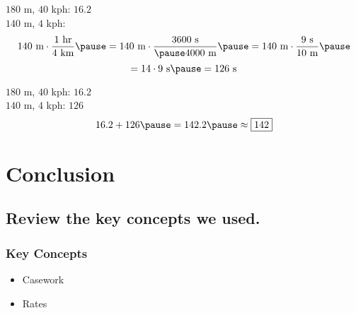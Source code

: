 \documentclass{beamer} %
\begin{document}
\begin{frame}
$180$ m, $40$ kph: $16.2$ \pause
\[
\]
$140$ m, $4$ kph: \pause
\[
140 \text{ m} \cdot \frac{1 \text{ hr}}{4 \text{ km}} \pause = 140 \text{ m} \cdot \frac{3600 \text{ s}}{\pause 4000 \text{ m}} \pause = 140 \text{ m} \cdot \frac{9 \text{ s}}{10 \text{ m}} \pause
\]
\[
= 14 \cdot 9 \text{ s} \pause = 126 \text{ s}
\]
\end{frame}

\begin{frame}
$180$ m, $40$ kph: $16.2$
\[
\]
$140$ m, $4$ kph: $126$ \pause
\[
16.2 + 126 \pause = 142.2 \pause \approx \boxed{142}
\]
\end{frame}

\setcounter{equation}{0}

\section{Conclusion}

\subsection*{Review the key concepts we used.}

\begin{frame}
  \frametitle{Key Concepts}
  \pause
  \begin{itemize}
  \item Casework \pause
  \item Rates
  \end{itemize}
\end{frame}

\begin{comment}

\subsection*{This is Tim.}

\tcbset{colframe=ml3}

\begin{frame}
\begin{center}
\begin{figure}
\tcbox{\texttt{[image: sanders.png]}}
``Hi everybody, this is Tim.''
\end{figure}
\end{center}
\end{frame}

\end{comment}
\end{document}
